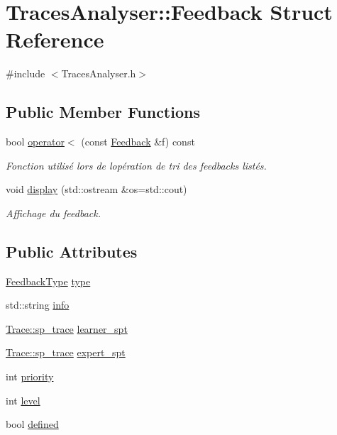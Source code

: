 \hypertarget{struct_traces_analyser_1_1_feedback}{}\section{Traces\+Analyser\+:\+:Feedback Struct Reference}
\label{struct_traces_analyser_1_1_feedback}


{\ttfamily \#include $<$Traces\+Analyser.\+h$>$}

\subsection*{Public Member Functions}
\begin{DoxyCompactItemize}
\item 
bool \hyperlink{struct_traces_analyser_1_1_feedback_a3597de15c1c142a06bc044d35eff110a}{operator$<$} (const \hyperlink{struct_traces_analyser_1_1_feedback}{Feedback} \&f) const 
\begin{DoxyCompactList}\small\item\em Fonction utilisé lors de l\textquotesingle{}opération de tri des feedbacks listés. \end{DoxyCompactList}\item 
void \hyperlink{struct_traces_analyser_1_1_feedback_affc7db79662d3e99b01e3cf3ca5e1616}{display} (std\+::ostream \&os=std\+::cout)
\begin{DoxyCompactList}\small\item\em Affichage du feedback. \end{DoxyCompactList}\end{DoxyCompactItemize}
\subsection*{Public Attributes}
\begin{DoxyCompactItemize}
\item 
\hyperlink{class_traces_analyser_a57be29ce5ac10ca51e56d8385b4a1820}{Feedback\+Type} \hyperlink{struct_traces_analyser_1_1_feedback_a828dbdc4ca2e76874679e91a5245996e}{type}
\item 
std\+::string \hyperlink{struct_traces_analyser_1_1_feedback_a3300931839b28cbf4a2d1faa3028c679}{info}
\item 
\hyperlink{class_trace_a9c58e523529fc8a03fb6acf3eef86150}{Trace\+::sp\+\_\+trace} \hyperlink{struct_traces_analyser_1_1_feedback_a1c4848a6f5ad484386c1baaac8270a27}{learner\+\_\+spt}
\item 
\hyperlink{class_trace_a9c58e523529fc8a03fb6acf3eef86150}{Trace\+::sp\+\_\+trace} \hyperlink{struct_traces_analyser_1_1_feedback_ab0783087941c78c1ac592a1e284d4396}{expert\+\_\+spt}
\item 
int \hyperlink{struct_traces_analyser_1_1_feedback_ad139e027aaebcb9f3b4cfe4a5a7c5ff7}{priority}
\item 
int \hyperlink{struct_traces_analyser_1_1_feedback_a4ec88472bb7b925d548267cb263ee81b}{level}
\item 
bool \hyperlink{struct_traces_analyser_1_1_feedback_a3d84d2d22c4639d2c04789c054120c27}{defined}
\end{DoxyCompactItemize}


